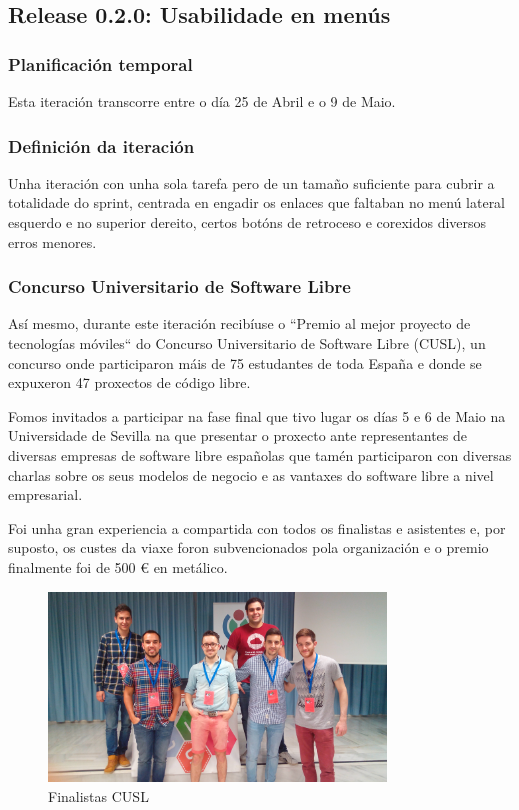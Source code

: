     \subsection{Release 0.2.0: Usabilidade en menús}

      \subsubsection{Planificación temporal}
      Esta iteración transcorre entre o día 25 de Abril e o 9 de Maio.

      \subsubsection{Definición da iteración}
      Unha iteración con unha sola tarefa pero de un tamaño suficiente para 
cubrir a totalidade do sprint, centrada en engadir os enlaces que faltaban no 
menú lateral esquerdo e no superior dereito, certos botóns de retroceso e 
corexidos diversos erros menores.

      \subsubsection{Concurso Universitario de Software Libre}
      Así mesmo, durante este iteración recibíuse o ``Premio al mejor proyecto 
de tecnologías móviles`` do Concurso Universitario de Software Libre (CUSL), un 
concurso onde participaron máis de 75 estudantes de toda España e donde se 
expuxeron 47 proxectos de código libre.

      Fomos invitados a participar na fase final que tivo lugar os días 5 e 6 
de Maio na Universidade de Sevilla na que presentar o proxecto ante 
representantes de diversas empresas de software libre españolas que tamén 
participaron con diversas charlas sobre os seus modelos de negocio e as 
vantaxes do software libre a nivel empresarial.

      Foi unha gran experiencia a compartida con todos os finalistas e 
asistentes e, por suposto, os custes da viaxe foron subvencionados pola 
organización e o premio finalmente foi de 500 \euro{} en metálico.

    \begin{figure}[h!]
          \begin{center}
            \includegraphics[width=0.8\textwidth]{./img/final_cusl.jpg}
            \caption{Finalistas CUSL}
          \end{center}
    \end{figure}

